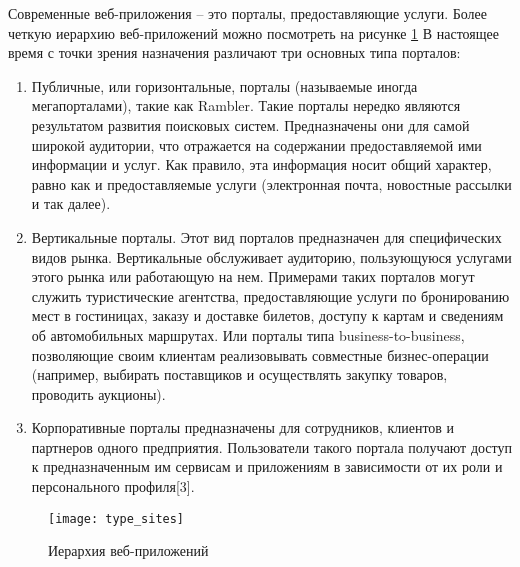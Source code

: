 Современные веб-приложения -- это порталы, предоставляющие услуги. Более четкую иерархию веб-приложений можно посмотреть на рисунке \ref{type_sites}
В настоящее время с точки зрения назначения различают три основных типа порталов:
\begin{enumerate}
\item Публичные, или горизонтальные, порталы (называемые иногда мегапорталами), такие как Rambler. Такие порталы нередко являются результатом развития поисковых систем. Предназначены они для самой широкой аудитории, что отражается на содержании предоставляемой ими информации и услуг. Как правило, эта информация носит общий характер, равно как и предоставляемые услуги (электронная почта, новостные рассылки и так далее).
\item  Вертикальные порталы. Этот вид порталов предназначен для специфических видов рынка. Вертикальные обслуживает аудиторию, пользующуюся услугами этого рынка или работающую на нем. Примерами таких порталов могут служить туристические агентства, предоставляющие услуги по бронированию мест в гостиницах, заказу и доставке билетов, доступу к картам и сведениям об автомобильных маршрутах. Или порталы типа business-to-business, позволяющие своим клиентам реализовывать совместные бизнес-операции (например, выбирать поставщиков и осуществлять закупку товаров, проводить аукционы).
\item Корпоративные порталы предназначены для сотрудников, клиентов и партнеров одного предприятия. Пользователи такого портала получают доступ к предназначенным им сервисам и приложениям в зависимости от их роли и персонального профиля[3].
\end{enumerate}

\begin{figure}[ht]
\center\texttt{[image: type\_sites]}
\caption{Иерархия веб-приложений}\label{type_sites}
\end{figure}

